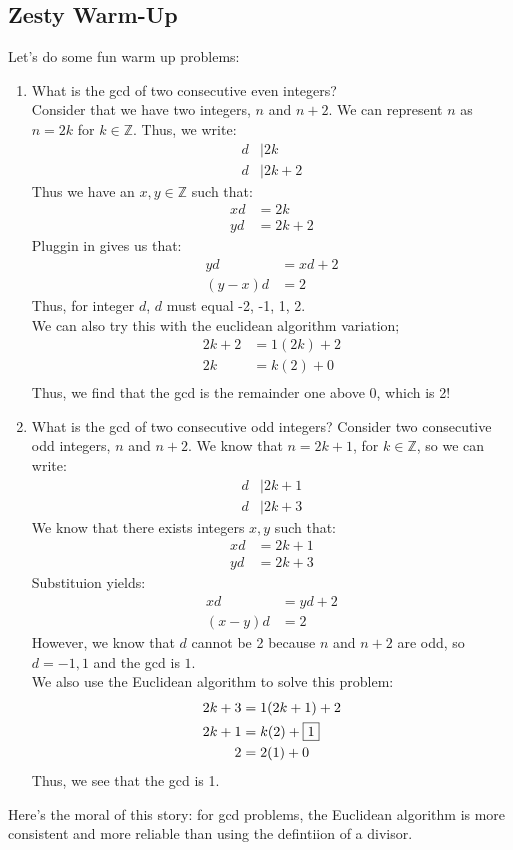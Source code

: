 \documentclass[10pt,oneside]{book}
\newcommand{\Z}{\mathbb{Z}}\newcommand{\R}{\mathbb{R}}\newcommand{\N}{\mathbb{N}}
\newcommand{\gspc}{\vspace{0.13cm}} %
\newcommand{\gline}{\gspc\\} %
\begin{document}
\subsection*{Zesty Warm-Up}
Let's do some fun warm up problems:
\begin{enumerate}
	\item [(a)] What is the gcd of two consecutive even integers?\gline
	Consider that we have two integers, $n$ and $n + 2$. We can represent $n$ as $n = 2k$ for $k\in \Z$. Thus, we write:
	\begin{align*}
		d&\mid 2k\\
		d&\mid 2k+2
	\end{align*}
	Thus we have an $x,y\in \Z$ such that:
	\begin{align*}
		xd &= 2k\\
		yd &= 2k+ 2
	\end{align*}
	Pluggin in gives us that:
	\begin{align*}
		yd &= xd + 2\\
		(y-x)d &= 2
	\end{align*}
	Thus, for integer $d$, $d$ must equal -2, -1, 1, 2.\gline
	We can also try this with the euclidean algorithm variation;
	\begin{align*}
		2k + 2 &= 1(2k) + 2\\
		2k &= k(2) + 0\\
	\end{align*}
	Thus, we find that the gcd is the remainder one above 0, which is 2!
	\item [(b)]What is the gcd of two consecutive odd integers?
	Consider two consecutive odd integers, $n$ and $n +2$. We know that $n = 2k + 1$, for $k\in \Z$, so we can write:
	\begin{align*}
		d&\mid 2k + 1\\
		d&\mid 2k + 3
	\end{align*}
	We know that there exists integers $x,y$ such that:
	\begin{align*}
		xd &= 2k + 1\\
		yd &= 2k + 3
	\end{align*}
	Substituion yields:
	\begin{align*}
		xd &= yd + 2\\
		(x-y)d &= 2
	\end{align*}
	However, we know that $d$ cannot be 2 because $n$ and $n+2$ are odd, so $d = -1, 1$ and the gcd is $1$.\gline
	We also use the Euclidean algorithm to solve this problem:
	\begin{align*}
		2k +3 &= 1(2k+1) + 2\\
		2k+1 &= k(2) + \fbox{1}\\
		2 &= 2(1) + 0
	\end{align*}
	Thus, we see that the gcd is 1. 
\end{enumerate}
Here's the moral of this story: for gcd problems, the Euclidean algorithm is more consistent and more reliable than using the defintiion of a divisor. 
\end{document}
